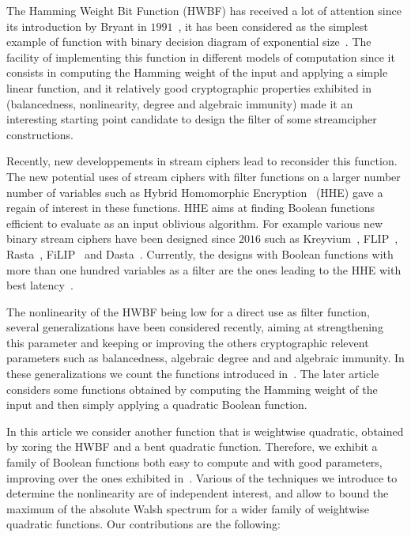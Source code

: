 \documentclass[11pt]{llncs}
\begin{document}

\iffalse

The Hamming Weight Bit Function (HWBF) has received a lot of attention since its introduction by Bryant
in $1991$~\cite{IEEE:Bryant91}, it has been considered as the simplest example of function with binary decision
diagram of exponential size~\cite{IEEE:Bryant91,TIA:BoLSW99}. 
The facility of implementing this function in different models of computation since it consists in computing the Hamming weight of the input and applying a simple linear function, and it relatively good cryptographic properties exhibited in~\cite{DAM:WCST14} (balancedness, nonlinearity, degree and algebraic immunity) made it an interesting starting point candidate to design the filter of some streamcipher constructions. 

Recently, new developpements in stream ciphers lead to reconsider this function.
The new potential uses of stream ciphers with filter functions on a larger number number of variables such as Hybrid Homomorphic Encryption~\cite{CCS:NaeLauVai11} (HHE) gave a regain of interest in these functions. HHE aims at finding Boolean functions efficient to evaluate as an input oblivious algorithm. 
For example various new binary stream ciphers have been designed since $2016$ such as Kreyvium~\cite{JOC:CCFLNP18}, FLIP~\cite{EC:MJSC16}, Rasta~\cite{C:Rasta}, FiLIP~\cite{INDO:MCJS19} and Dasta~\cite{TOSC:BeiLea20}. 
Currently, the designs with Boolean functions with more than one hundred variables as a filter are the ones leading to the HHE with best latency~\cite{INDO:HofMeaRic20,CCS:CDPP22,CIC:MeaParPei24}.

The nonlinearity of the HWBF being low for a direct use as filter function, several generalizations have been considered recently, aiming at strengthening this parameter and keeping or improving the others cryptographic relevent parameters such as balancedness, algebraic degree and and algebraic immunity. In these generalizations we count the functions introduced in~\cite{IEEE:Carlet22,eprint:CarPar23,DAM:MeaOza24}. The later article considers some functions obtained by computing the Hamming weight of the input and then simply applying a quadratic Boolean function.

In this article we consider another function that is weightwise quadratic, obtained by xoring the HWBF and a bent quadratic function. Therefore, we exhibit a family of Boolean functions both easy to compute and with good parameters, improving over the ones exhibited in~\cite{DAM:MeaOza24}. Various of the techniques we introduce to determine the nonlinearity are of independent interest, and allow to bound the maximum of the absolute Walsh spectrum for a wider family of weightwise quadratic functions. 
Our contributions are the following:
\end{document}
